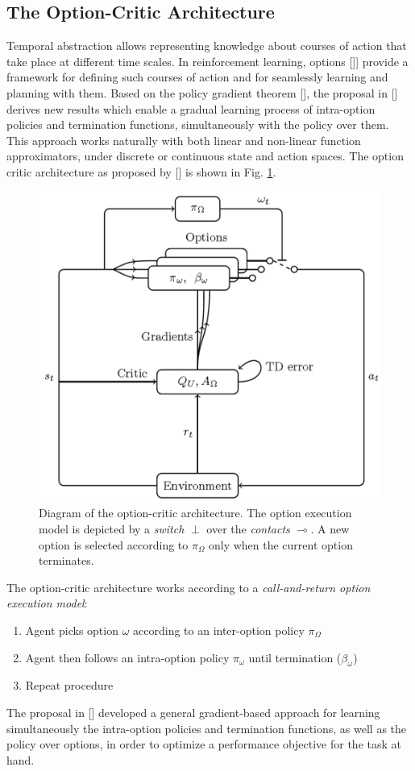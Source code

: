 \documentclass[conference]{IEEEtran}
\begin{document}
\subsection{The Option-Critic Architecture}
Temporal abstraction allows representing knowledge about courses of action that take place at different time scales. In reinforcement learning, options [\cite{sutton1999between}]] provide a framework for defining such courses of action and for seamlessly learning and planning with them. Based on the policy gradient theorem [\cite{sutton2000policy}], the proposal in [\cite{bacon2017option}] derives new results which enable a gradual learning process of intra-option policies and termination functions, simultaneously with the policy over them. This approach works naturally with both linear and non-linear function approximators, under discrete or continuous state and action spaces. The option critic architecture as proposed by [\cite{bacon2017option}] is shown in Fig. \ref{fig:option_critic_arch}. 
\begin{figure}[ht]
\centering
\includegraphics[width=0.9\columnwidth]{img/OptionCriticArch.png}
\caption{Diagram of the option-critic architecture. The option execution model is depicted by a \textit{switch} $\perp$ over the \textit{contacts} $\multimap$. A new option is selected according to $\pi_{\Omega}$ only when the current option terminates.}
\label{fig:option_critic_arch}
\end{figure}

The option-critic architecture works according to a \textit{call-and-return option execution model}:
\begin{enumerate}
    \item Agent picks option $\omega$ according to an inter-option policy $\pi_{\Omega}$
    \item Agent then follows an intra-option policy $\pi_{\omega}$ until termination ($\beta_{\omega}$)
    \item Repeat procedure
\end{enumerate}
The proposal in [\cite{bacon2017option}] developed a general gradient-based approach for learning simultaneously the intra-option policies and termination functions, as well as the policy over options, in order to optimize a performance objective for the task at hand.
\end{document}
